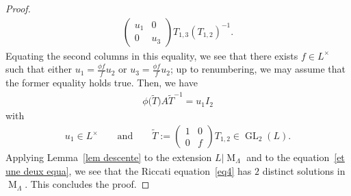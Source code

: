 \begin{proof}
\begin{gather*}
\begin{pmatrix}
u_{1}&0
\\
0&u_{3}
\end{pmatrix}
T_{1,3} (T_{1,2} )^{-1}.
\end{gather*}
Equating the second columns in this equality, we see that there exists $f \in L^{\times}$ such that either
$u_{1}=\frac{\phi f}{f} u_{2}$ or $u_{3}=\frac{\phi f}{f} u_{2}$; up to renumbering, we may assume that the former
equality holds true.
Then, we have
\begin{gather}
\label{et une deux equa}
\phi\big(\widetilde{T}\big)A\widetilde{T}^{-1}= u_{1} I_{2}
\end{gather}
with
\begin{gather*}
u_{1} \in L^{\times} \qquad \text{and} \qquad \widetilde{T}:=
\begin{pmatrix}
1&0
\\
0&f
\end{pmatrix}
T_{1,2}\in \operatorname{GL}_{2}(L).
\end{gather*}
Applying Lemma~\ref{lem descente} to the extension $L \vert \operatorname{M}_{\Lambda}$ and to the equation~\eqref{et
une deux equa}, we see that the Riccati equation~\eqref{eq4} has $2$ distinct solutions in $\operatorname{M}_{\Lambda}$.
This concludes the proof.
\end{proof}
